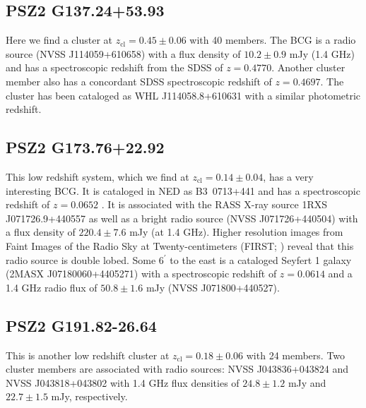 \documentclass[apj, revtex4-1]{emulateapj}
\begin{document}

\subsection{PSZ2 G137.24+53.93} %
Here we find a cluster at $z_\mathrm{cl} = 0.45 \pm 0.06$ with 40 members. The BCG is a radio source (NVSS J114059+610658) with a flux density of $10.2 \pm 0.9$ mJy (1.4 GHz) and has a spectroscopic redshift from the SDSS of $z=0.4770$. Another cluster member also has a concordant SDSS spectroscopic redshift of $z=0.4697$. The cluster has been cataloged as WHL J114058.8+610631 with a similar photometric redshift.

\subsection{PSZ2 G173.76+22.92} %
This low redshift system, which we find at $z_\mathrm{cl} = 0.14 \pm 0.04$, has a very interesting BCG. It is cataloged in NED as \hbox{B3 0713+441} and has a spectroscopic redshift of $z=0.0652$ \citep{Bauer2000}. It is associated with the RASS X-ray source 1RXS J071726.9+440557 as well as a bright radio source (NVSS J071726+440504) with a flux density of $220.4\pm 7.6$ mJy (at 1.4 GHz). Higher resolution images from Faint Images of the Radio Sky at Twenty-centimeters (FIRST; \citealt{Becker1995}) reveal that this radio source is double lobed. Some 6$^\prime$ to the east is a cataloged Seyfert 1 galaxy (2MASX J07180060+4405271) with a spectroscopic redshift of $z=0.0614$ \citep{Michel1988} and a 1.4 GHz radio flux of $50.8 \pm 1.6 $ mJy (NVSS J071800+440527).


\subsection{PSZ2 G191.82-26.64} %
This is another low redshift cluster at $z_\mathrm{cl} = 0.18 \pm 0.06$ with 24 members. Two cluster members are associated with radio sources: NVSS J043836+043824 and NVSS J043818+043802 with 1.4 GHz flux densities of $24.8 \pm 1.2$ mJy and $22.7 \pm 1.5$ mJy, respectively.
\end{document}

